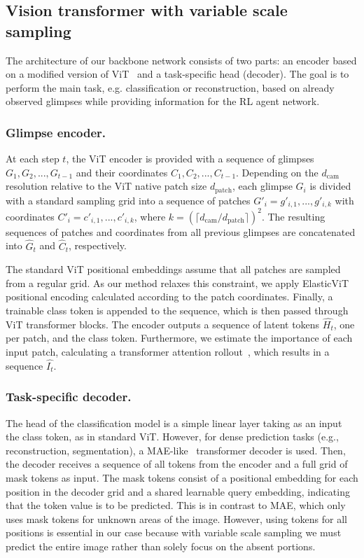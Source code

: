 \documentclass[runningheads]{llncs}
\newcommand{\dcam}{d_{\text{cam}}}
\newcommand{\dpatch}{d_{\text{patch}}}
\begin{document}
\subsection{Vision transformer with variable scale sampling}
\label{sec:elasticvit}

The architecture of our backbone network consists of two parts: an encoder based on a modified version of ViT~\cite{dosovitskiy2020vit} and a task-specific head (decoder). The goal is to perform the main task, e.g. classification or reconstruction, based on already observed glimpses while providing information for the RL agent network.

\subsubsection{Glimpse encoder.}
At each step $t$, the ViT encoder is provided with a sequence of glimpses $G_1, G_2, ..., G_{t-1}$ and their coordinates $C_1, C_2, ..., C_{t-1}$. Depending on the $\dcam$ resolution relative to the ViT native patch size $\dpatch$, each glimpse $G_i$ is divided with a standard sampling grid into a sequence of patches $G'_i = g'_{i,1}, ..., g'_{i, k}$ with coordinates $C'_i = c'_{i,1}, ..., c'_{i, k}$, where $k = (\lceil \dcam / \dpatch \rceil)^2$. The resulting sequences of patches and coordinates from all previous glimpses are concatenated into $\widehat{G}_t$ and $\widehat{C}_t$, respectively.

The standard ViT positional embeddings assume that all patches are sampled from a regular grid. As our method relaxes this constraint, we apply ElasticViT~\cite{pardyl2023beyond} positional encoding calculated according to the patch coordinates. Finally, a trainable class token is appended to the sequence, which is then passed through ViT transformer blocks. The encoder outputs a sequence of latent tokens $\widehat{H_t}$, one per patch, and the class token. Furthermore, we estimate the importance of each input patch, calculating a transformer attention rollout~\cite{abnar2020quantifying}, which results in a sequence $\widehat{I_t}$.

\subsubsection{Task-specific decoder.}
The head of the classification model is a simple linear layer taking as an input the class token, as in standard ViT. However, for dense prediction tasks (e.g., reconstruction, segmentation), a MAE-like~\cite{he2022masked} transformer decoder is used. Then, the decoder receives a sequence of all tokens from the encoder and a full grid of mask tokens as input. The mask tokens consist of a positional embedding for each position in the decoder grid and a shared learnable query embedding, indicating that the token value is to be predicted. This is in contrast to MAE, which only uses mask tokens for unknown areas of the image. However, using tokens for all positions is essential in our case because with variable scale sampling we must predict the entire image rather than solely focus on the absent portions.
\end{document}
